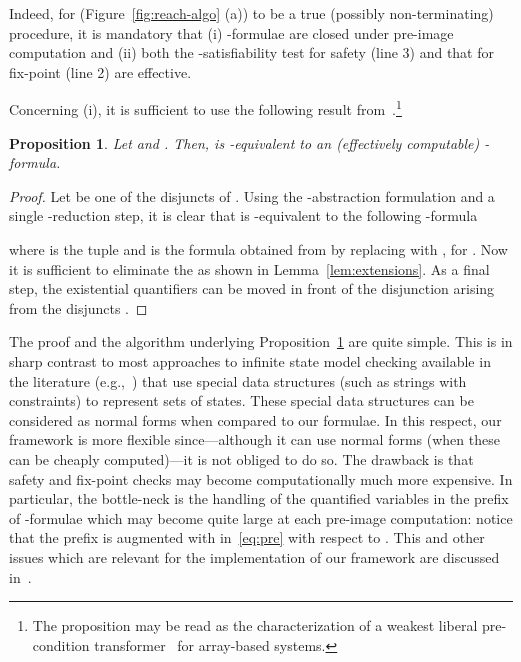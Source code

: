 \documentclass{LMCS}
\theoremstyle{plain}\newtheorem{assumption}[thm]{Assumption}
\theoremstyle{plain}\newtheorem{proposition}[thm]{Proposition}
\theoremstyle{plain}\newtheorem{property}[thm]{Property}
\theoremstyle{plain}\newtheorem{example}[thm]{Example}
\theoremstyle{plain}\newtheorem{claim}[thm]{Claim}
\theoremstyle{plain}\newtheorem{lemma}[thm]{Lemma}
\begin{document}
Indeed, for  (Figure~\ref{fig:reach-algo} (a)) to be
a true (possibly non-terminating) procedure, it is mandatory that (i)
-formulae are closed under pre-image computation and (ii)
both the -satisfiability test for safety (line 3) and that for
fix-point (line 2) are effective.

Concerning (i), it is sufficient to use the following result
from~\cite{avocs08}.\footnote{The proposition may be read as the
  characterization of a weakest liberal pre-condition
  transformer~\cite{wlp} for array-based systems.}
\begin{proposition}
  \label{prop:trans}
  Let 
and .
Then,  is -equivalent to an (effectively
  computable) -formula.
\end{proposition}
\begin{proof}
  Let  be one of the  disjuncts of . Using the
  -abstraction formulation and a single -reduction
  step, it is clear that  is -equivalent to the
  following -formula

  where  is the tuple  and  is the formula obtained from
   by replacing  with
  , for .  Now it is
  sufficient to eliminate the  as shown in
  Lemma~\ref{lem:extensions}. As a final step, the existential
  quantifiers can be moved in front of the disjunction arising from
  the  disjuncts .
\end{proof}
The proof and the algorithm underlying Proposition~\ref{prop:trans}
are quite simple.  This is in sharp contrast to most approaches to
infinite state model checking available in the literature
(e.g.,~\cite{tacas06,cav06}) that use special data structures (such as
strings with constraints) to represent sets of states. These special
data structures can be considered as normal forms when compared to our
formulae.  In this respect, our framework is more flexible
since---although it can use normal forms (when these can be cheaply
computed)---it is not obliged to do so.
The drawback is that safety and fix-point checks may become
computationally much more expensive.  In particular, the bottle-neck
is the handling of the quantified variables in the prefix of
-formulae which may become quite large at each pre-image
computation: notice that the prefix  is augmented with
 in~\eqref{eq:pre} with respect to .  This and other
issues which are relevant for the implementation of our framework are
discussed in~\cite{avocs08,afm09,ijcar10}.
\end{document}
